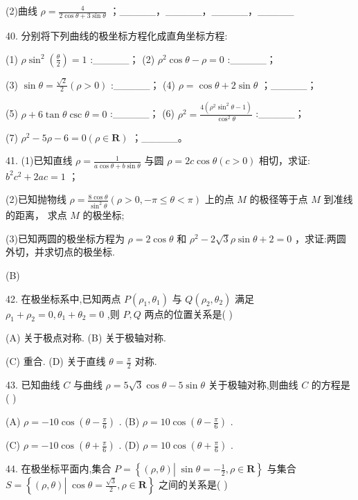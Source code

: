 \documentclass[10pt]{article}
\begin{document}
(2)曲线 \(\rho  = \frac{4}{2\cos \theta  + 3\sin \theta }\) ；\_\_\_\_\_，\_\_\_\_\_，\_\_\_\_\_，\_\_\_\_\_

40. 分别将下列曲线的极坐标方程化成直角坐标方程:

(1) \(\rho {\sin }^{2}\left( \frac{\theta }{2}\right)  = 1\) :\_\_\_\_\_； (2) \({\rho }^{2}\cos \theta  - \rho  = 0\) :\_\_\_\_\_；

(3) \(\sin \theta  = \frac{\sqrt{2}}{2}\left( {\rho  > 0}\right)\) :\_\_\_\_\_； (4) \(\rho  = \cos \theta  + 2\sin \theta\) ；\_\_\_\_\_；

(5) \(\rho  + 6\tan \theta \csc \theta  = 0\) :\_\_\_\_\_； (6) \({\rho }^{2} = \frac{4\left( {{\rho }^{2}{\sin }^{2}\theta  - 1}\right) }{{\cos }^{2}\theta }\) :\_\_\_\_\_；

(7) \({\rho }^{2} - {5\rho } - 6 = 0\left( {\rho  \in  \mathbf{R}}\right)\) ；\_\_\_\_\_。

41. (1)已知直线 \(\rho  = \frac{1}{a\cos \theta  + b\sin \theta }\) 与圆 \(\rho  = {2c}\cos \theta \left( {c > 0}\right)\) 相切，求证: \({b}^{2}{c}^{2} + {2ac} = 1\) ；

(2)已知抛物线 \(\rho  = \frac{8\cos \theta }{{\sin }^{2}\theta }\left( {\rho  > 0, - \pi  \leq  \theta  < \pi }\right)\) 上的点 \(M\) 的极径等于点 \(M\) 到准线的距离， 求点 \(M\) 的极坐标;

(3)已知两圆的极坐标方程为 \(\rho  = 2\cos \theta\) 和 \({\rho }^{2} - 2\sqrt{3}\rho \sin \theta  + 2 = 0\) ，求证:两圆外切，并求切点的极坐标.

(B)

42. 在极坐标系中,已知两点 \(P\left( {{\rho }_{1},{\theta }_{1}}\right)\) 与 \(Q\left( {{\rho }_{2},{\theta }_{2}}\right)\) 满足 \({\rho }_{1} + {\rho }_{2} = 0,{\theta }_{1} + {\theta }_{2} = 0\) ,则 \(P,Q\) 两点的位置关系是( )

(A) 关于极点对称. (B) 关于极轴对称.

(C) 重合. (D) 关于直线 \(\theta  = \frac{\pi }{2}\) 对称.

43. 已知曲线 \(C\) 与曲线 \(\rho  = 5\sqrt{3}\cos \theta  - 5\sin \theta\) 关于极轴对称,则曲线 \(C\) 的方程是 ( )

(A) \(\rho  =  - {10}\cos \left( {\theta  - \frac{\pi }{6}}\right)\) . (B) \(\rho  = {10}\cos \left( {\theta  - \frac{\pi }{6}}\right)\) .

(C) \(\rho  =  - {10}\cos \left( {\theta  + \frac{\pi }{6}}\right)\) . (D) \(\rho  = {10}\cos \left( {\theta  + \frac{\pi }{6}}\right)\) .

44. 在极坐标平面内,集合 \(P = \left\{  {\left( {\rho ,\theta }\right) \left| {\;\sin \theta  =  - \frac{1}{2}}\right. ,\rho  \in  \mathbf{R}}\right\}\) 与集合 \(S = \left\{  {\left( {\rho ,\theta }\right) \left| {\;\cos \theta  = \frac{\sqrt{3}}{2}}\right. ,\rho  \in  \mathbf{R}}\right\}\) 之间的关系是( )
\end{document}
